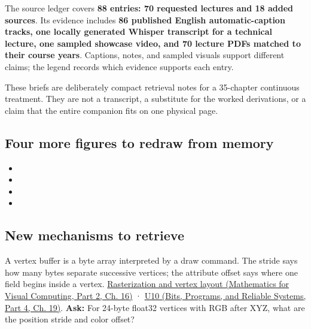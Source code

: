 \hypertarget{appendix-a8f634b076b5-evidence-and-scope}{}

The source ledger covers \textbf{88 entries: 70 requested lectures and 18 added sources}. Its evidence includes \textbf{86 published English automatic-caption tracks, one locally generated Whisper transcript for a technical lecture, one sampled showcase video, and 70 lecture PDFs matched to their course years}. Captions, notes, and sampled visuals support different claims; the legend records which evidence supports each entry.

These briefs are deliberately compact retrieval notes for a 35-chapter continuous treatment. They are not a transcript, a substitute for the worked derivations, or a claim that the entire companion fits on one physical page.

\subsection{Four more figures to redraw from memory}\label{appendix-a8f634b076b5-four-more-figures-to-redraw-from-memory}

\hypertarget{appendix-a8f634b076b5-four-more-figures-to-redraw-from-memory}{}

\begin{itemize}
\tightlist
\item
\item
\item
\item
\end{itemize}

\subsection{New mechanisms to retrieve}\label{appendix-a8f634b076b5-new-mechanisms-to-retrieve}

\hypertarget{appendix-a8f634b076b5-new-mechanisms-to-retrieve}{}

A vertex buffer is a byte array interpreted by a draw command. The stride says how many bytes separate successive vertices; the attribute offset says where one field begins inside a vertex. \href{../02-Mathematics-for-Visual-Computing-P02/main.pdf\#nameddest=03-visual-computing-i-ch012-rasterization-coverage-and-depth}{Rasterization and vertex layout (Mathematics for Visual Computing, Part 2, Ch. 16)} · \href{../01-Bits-Programs-and-Reliable-Systems-P04/main.pdf\#nameddest=03-visual-computing-i-ch018-figure-u10---vertex-fetch-uses-a-stride-and-byte-offset}{U10 (Bits, Programs, and Reliable Systems, Part 4, Ch. 19)}. \textbf{Ask:} For 24-byte float32 vertices with RGB after XYZ, what are the position stride and color offset?

